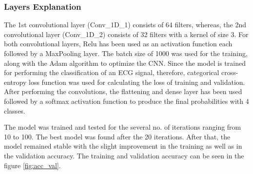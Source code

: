 \subsubsection{Layers Explanation}
The 1st convolutional layer (Conv\_1D\_1) consists of 64 filters, whereas, the 2nd convolutional layer (Conv\_1D\_2) consists of 32 filters with a kernel of size 3. For both convolutional layers, Relu has been used as an activation function each followed by a MaxPooling layer. The batch size of 1000 was used for the training, along with the Adam algorithm to optimize the CNN. Since the model is trained for performing the classification of an ECG signal, therefore, categorical cross-entropy loss function was used for calculating the loss of training and validation. After performing the convolutions, the flattening and dense layer has been used followed by a softmax activation function to produce the final probabilities with 4 classes.


The model was trained and tested for the several no. of iterations ranging from 10 to 100. The best model was found after the 20 iterations. After that, the model remained stable with the slight improvement in the training as well as in the validation accuracy. The training and validation accuracy can be seen in the figure \ref{fig:acc_val}.

